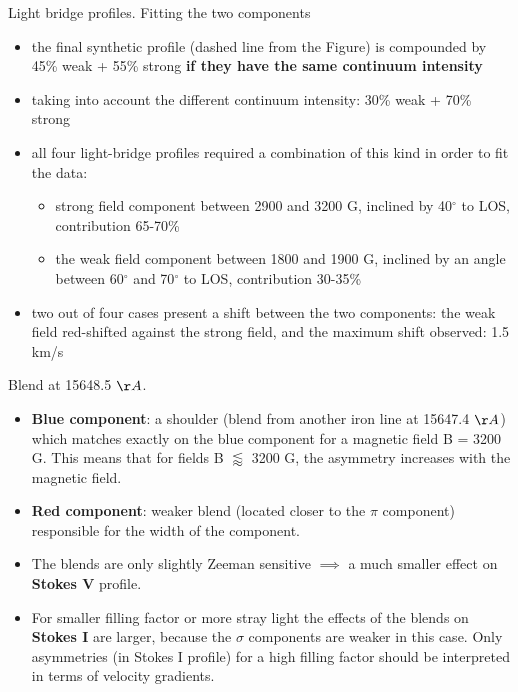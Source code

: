 \documentclass{beamer}
\begin{document}
\begin{frame}{Light bridge profiles. Fitting the two components}
\begin{itemize}
\item the final synthetic profile (dashed line from the Figure) is compounded by 45\% weak + 55\% strong 
{\bf if they have the same continuum intensity}
\item taking into account the different continuum intensity:  30\% weak + 70\% strong
\item all four light-bridge profiles required a combination of this kind in order to fit the data:
\begin{itemize}
\item strong field component between 2900 and 3200 G, inclined by 40$^{\circ}$ to LOS, contribution 65-70\%
\item the weak field component between 1800 and 1900 G, inclined by an angle between 60$^{\circ}$ and 70$^{\circ}$
to LOS, contribution 30-35\% 
\end{itemize}
\item two out of four cases present a shift between the two components: the weak field red-shifted against the strong field, 
and the maximum shift observed: 1.5 km/s
\end{itemize}
\end{frame}

\begin{frame}{Blend at 15648.5 $\AA$. }
\begin{itemize}
\item {\bf Blue component}: a shoulder (blend from another iron line at 15647.4 $\AA$) which matches exactly on the blue component for 
a magnetic field B = 3200 G.
This means that for fields B $\lessapprox$ 3200 G, the asymmetry increases with the magnetic field.
\item {\bf Red component}: weaker blend (located closer to the $\pi$ component) responsible for the width of the component.
\end{itemize}
\begin{itemize}
\item The blends are only slightly Zeeman sensitive $\implies$ a much smaller effect on {\bf Stokes V} profile.
\item For smaller filling factor or more stray light the effects of the blends on {\bf Stokes I} are larger, because the 
$\sigma$ components are weaker in this case. Only asymmetries (in Stokes I profile) for a high filling factor should be interpreted
in terms of velocity gradients.
\end{itemize}
\end{frame}
\end{document}
